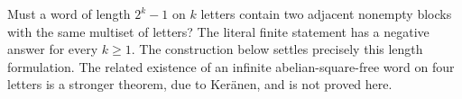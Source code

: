 Must a word of length $2^k-1$ on $k$ letters contain two adjacent
nonempty blocks with the same multiset of letters? The literal finite
statement has a negative answer for every $k\geq1$.
The construction below settles precisely this length formulation.
The related existence of an infinite abelian-square-free word on four
letters is a stronger theorem, due to Ker\"anen, and is not proved here.
